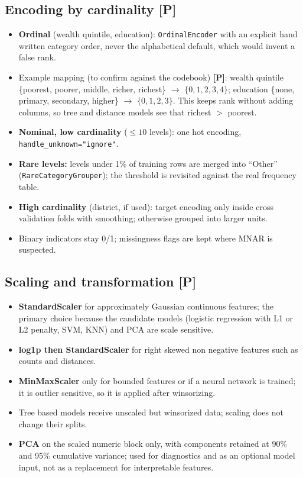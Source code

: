 \documentclass[11pt,a4paper]{article}
\newcommand{\Pl}{\textbf{[P]}}   %
\begin{document}
\subsection{Encoding by cardinality \Pl}
\begin{itemize}
\item \textbf{Ordinal} (wealth quintile, education): \texttt{OrdinalEncoder} with an explicit hand written category order, never the alphabetical default, which would invent a false rank.
\item Example mapping (to confirm against the codebook) \Pl: wealth quintile \{poorest, poorer, middle, richer, richest\} $\rightarrow$ $\{0,1,2,3,4\}$; education \{none, primary, secondary, higher\} $\rightarrow$ $\{0,1,2,3\}$. This keeps rank without adding columns, so tree and distance models see that richest $>$ poorest.
\item \textbf{Nominal, low cardinality} ($\le 10$ levels): one hot encoding, \texttt{handle\_unknown="ignore"}.
\item \textbf{Rare levels:} levels under 1\% of training rows are merged into ``Other'' (\texttt{RareCategoryGrouper}); the threshold is revisited against the real frequency table.
\item \textbf{High cardinality} (district, if used): target encoding only inside cross validation folds with smoothing; otherwise grouped into larger units.
\item Binary indicators stay 0/1; missingness flags are kept where MNAR is suspected.
\end{itemize}

\subsection{Scaling and transformation \Pl}
\begin{itemize}
\item \textbf{StandardScaler} for approximately Gaussian continuous features; the primary choice because the candidate models (logistic regression with L1 or L2 penalty, SVM, KNN) and PCA are scale sensitive.
\item \textbf{log1p then StandardScaler} for right skewed non negative features such as counts and distances.
\item \textbf{MinMaxScaler} only for bounded features or if a neural network is trained; it is outlier sensitive, so it is applied after winsorizing.
\item Tree based models receive unscaled but winsorized data; scaling does not change their splits.
\item \textbf{PCA} on the scaled numeric block only, with components retained at 90\% and 95\% cumulative variance; used for diagnostics and as an optional model input, not as a replacement for interpretable features.
\end{itemize}
\end{document}
